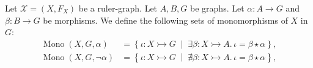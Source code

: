 
\begin{notation}
     Let \( \mathcal{X} = (X, F_X) \) be a ruler-graph. Let \( A, B, G \) be graphs. Let \( \alpha \colon A \to G \) and \( \beta \colon B \to G \) be morphisms. 
    We define the following sets of monomorphisms of $X$ in $G$: 
    \begin{align*}
        \operatorname{Mono}(X,G,\alpha) &= \left\{ \iota \colon X \rightarrowtail G \;\middle|\; \exists \beta \colon X \rightarrowtail A.\, \iota = \beta \star \alpha \right\}, 
        \\
        \operatorname{Mono}(X,G,\lnot \alpha) &= \left\{ \iota \colon X \rightarrowtail G \;\middle|\; \nexists \beta \colon X \rightarrowtail A.\, \iota = \beta \star \alpha \right\}, 

\end{align*}
\end{notation}
